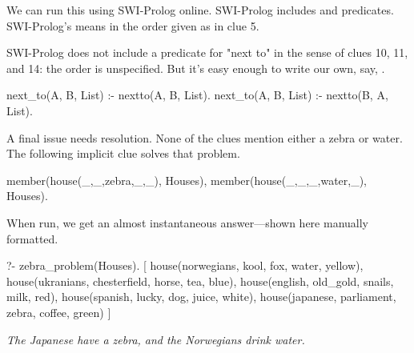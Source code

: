 We can run this using SWI-Prolog online. SWI-Prolog includes  and  predicates. SWI-Prolog's  means in the order given as in clue 5.
\smallv 

SWI-Prolog does not include a predicate for "next to" in the sense of clues 10, 11, and 14: the order is unspecified. But it's easy enough to write our own, say, .
\begin{python}
next_to(A, B, List) :- nextto(A, B, List).
next_to(A, B, List) :- nextto(B, A, List).
\end{python}
A final issue needs resolution. None of the clues mention either a zebra or water. The following implicit clue solves that problem.

\begin{minipage}{\linewidth}
\begin{python}
    member(house(_,_,zebra,_,_), Houses),
    member(house(_,_,_,water,_), Houses).
\end{python}
\end{minipage}
When run, we get an almost instantaneous answer---shown here manually formatted.

\begin{minipage}{\linewidth}
\begin{python}
?- zebra_problem(Houses).
[    
    house(norwegians, kool, fox, water, yellow), 
    house(ukranians, chesterfield, horse, tea, blue), 
    house(english, old_gold, snails, milk, red), 
    house(spanish, lucky, dog, juice, white), 
    house(japanese, parliament, zebra, coffee, green)     
]
\end{python}
\end{minipage}
\smallv

\textit{The Japanese have a zebra, and the Norwegians drink water.}
\smallv
\smallv
\smallv

